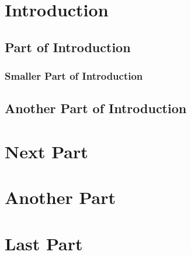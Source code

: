 \documentclass[12pt]{article}
\begin{document}
\section{Introduction}
\lipsum[1]
\subsection{Part of Introduction}
\lipsum[2]
\subsubsection{Smaller Part of Introduction}
\lipsum[3]
\subsection{Another Part of Introduction}
\lipsum[7]
\section{Next Part}
\lipsum[4-5]
\section*{Another Part}
\lipsum[6]
\section{Last Part}
\lipsum[7]
\end{document}
